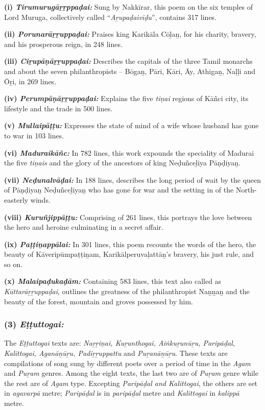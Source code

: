 \textbf{(i) \textit{Tirumurugāṟṟppaḍai:}} Sung by Nakkīrar, this poem on the six temples of Lord Muruga, collectively called “\textit{Aṟupaḍaivīḍu}”, contains 317 lines.

\textbf{(ii) \textit{Porunarāṟṟuppaḍai:}} Praises king Karikāla Cōḻaṉ, for his charity, bravery, and his prosperous reign, in 248 lines.

\textbf{(iii) \textit{Ciṟupāṇāṟṟuppaḍai:}} Describes the capitals of the three Tamil monarchs and about the seven philanthropists – Bōgaṉ, Pāri, Kāri, Āy, Athigaṉ, Naḷḷi and Ōṟi, in 269 lines.

\textbf{(iv) \textit{Perumpāṇāṟṟuppaḍai:}} Explains the five \textit{tiṇai} regions of Kāñci city, its lifestyle and the trade in 500 lines.

\textbf{(v) \textit{Mullaipāṭṭu:}} Expresses the state of mind of a wife whose husband has gone to war in 103 lines.

\textbf{(vi) \textit{Maduraikāñc:}} In 782 lines, this work expounds the speciality of Madurai the five \textit{tiṇais} and the glory of the ancestors of king Neḍuñceḻiya Pāṇḍiyaṉ.

\textbf{(vii) \textit{Neḍunalvāḍai:}} In 188 lines, describes the long period of wait by the queen of Pāṇḍiyaṉ Neḍuñceḻiyaṉ who has gone for war and the setting in of the North-easterly winds.

\textbf{(viii) \textit{Kuruñjippāṭṭu:}} Comprising of 261 lines, this portrays the love between the hero and heroine culminating in a secret affair.

\textbf{(ix) \textit{Paṭṭiṉappālai:}} In 301 lines, this poem recounts the words of the hero, the beauty of Kāveripūmpaṭṭiṉam, Karikālperuvaḷattāṉ's bravery, his just rule, and so on.

\textbf{(x) \textit{Malaipaḍukaḍām:}} Containing 583 lines, this text also called as \textit{Kūttarāṟṟuppaḍai}, outlines the greatness of the philanthropist Naṉṉaṉ and the beauty of the forest, mountain and groves possessed by him.


\subsubsection*{(3) \textit{Eṭṭuttogai:}}

\vskip -7pt

The \textit{Eṭṭuttogai} texts are: \textit{Naṟṟiṇai, Kuṟunthogai, Aiṅkuṟunūṟu, Paripāḍal, Kalittogai, Aganāṉūṟu, Padiṟṟuppattu} and \textit{Puṟanāṉūṟu}. These texts are compilations of song sung by different poets over a period of time in the \textit{Agam} and \textit{Puṟam} genres. Among the eight texts, the last two are of \textit{Puṟam} genre while the rest are of \textit{Agam} type. Excepting \textit{Paripāḍal and Kalittogai}, the others are set in \textit{agavarpā} metre; \textit{Paripāḍal} is in \textit{paripāḍal} metre and \textit{Kalittogai} in \textit{kalippā} metre.


